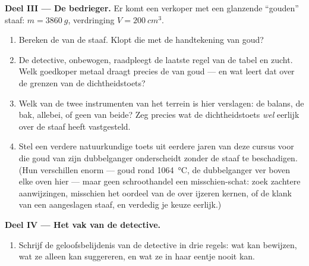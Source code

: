 \begin{problem}
\medskip\noindent\textbf{Deel III --- De bedrieger.}
Er komt een verkoper met een glanzende ``gouden'' staaf:
$m = \qty{3860}{g}$, verdringing $V = \qty{200}{cm^3}$.
\begin{enumerate}[resume]
  \item Bereken de  van de staaf. Klopt die met de
        handtekening van goud?
  \item De detective, onbewogen, raadpleegt de laatste regel van de
        tabel en zucht. Welk goedkoper metaal draagt precies de
         van goud --- en wat leert dat over de grenzen van
        de dichtheidstoets?
  \item Welk van de twee instrumenten van het terrein is hier
        verslagen: de balans, de bak, allebei, of geen van beide? Zeg
        precies wat de dichtheidstoets \emph{wel} eerlijk over de
        staaf heeft vastgesteld.
  \item Stel een verdere natuurkundige toets uit eerdere jaren van
        deze cursus voor die goud van zijn dubbelganger onderscheidt
        zonder de staaf te beschadigen. (Hun 
        verschillen enorm --- goud rond \qty{1064}{\celsius}, de
        dubbelganger ver boven elke oven hier --- maar geen
        schroothandel  een misschien-schat: zoek zachtere
        aanwijzingen, misschien het oordeel van de  over
        ijzeren kernen, of de klank van een aangeslagen staaf, en
        verdedig je keuze eerlijk.)
\end{enumerate}

\medskip\noindent\textbf{Deel IV --- Het vak van de detective.}
\begin{enumerate}[resume]
  \item Schrijf de geloofsbelijdenis van de detective in drie regels:
        wat  kan bewijzen, wat ze alleen kan suggereren, en
        wat ze in haar eentje nooit kan.
\end{enumerate}
\end{problem}
